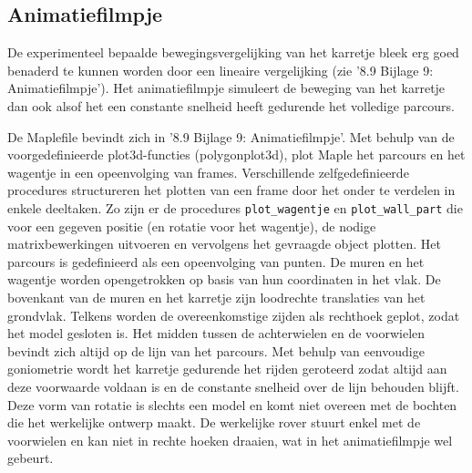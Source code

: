 \subsection{Animatiefilmpje}

De experimenteel bepaalde bewegingsvergelijking van het karretje bleek erg goed benaderd te kunnen worden door een lineaire vergelijking (zie '8.9 Bijlage 9: Animatiefilmpje').
Het animatiefilmpje simuleert de beweging van het karretje dan ook alsof het een constante snelheid heeft gedurende het volledige parcours.

De Maplefile bevindt zich in '8.9 Bijlage 9: Animatiefilmpje'. Met behulp van de voorgedefinieerde plot3d-functies (polygonplot3d), plot Maple het parcours en het wagentje in een opeenvolging van frames.
Verschillende zelfgedefinieerde procedures structureren het plotten van een frame door het onder te verdelen in enkele deeltaken. Zo zijn er de procedures \verb|plot_wagentje| en \verb|plot_wall_part| die voor een gegeven positie (en rotatie voor het wagentje), de nodige matrixbewerkingen uitvoeren en vervolgens het gevraagde object plotten.
Het parcours is gedefinieerd als een opeenvolging van punten. De muren en het wagentje worden opengetrokken op basis van hun coordinaten in het vlak. De bovenkant van de muren en het karretje zijn loodrechte translaties van het grondvlak. Telkens worden de overeenkomstige zijden als rechthoek geplot, zodat het model gesloten is.
Het midden tussen de achterwielen en de voorwielen bevindt zich altijd op de lijn van het parcours. Met behulp van eenvoudige goniometrie wordt het karretje gedurende het rijden geroteerd zodat altijd aan deze voorwaarde voldaan is en de constante snelheid over de lijn behouden blijft. Deze vorm van rotatie is slechts een model en komt niet overeen met de bochten die het werkelijke ontwerp maakt.
De werkelijke rover stuurt enkel met de voorwielen en kan niet in rechte hoeken draaien, wat in het animatiefilmpje wel gebeurt.